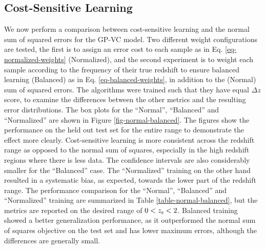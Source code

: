 \documentclass[useAMS,usenatbib,fleqn]{mn2e}
\begin{document}
\subsection{Cost-Sensitive Learning}

We now perform a comparison between cost-sensitive learning and the normal sum of squared errors for the GP-VC model. Two different weight configurations are tested, the first is to assign an error cost to each sample as in Eq. \eqref{eq-normalized-weights} (Normalized), and the second experiment is to weight each sample according to the frequency of their true redshift to ensure balanced learning (Balanced) as in Eq. \eqref{eq-balanced-weights}, in addition to the (Normal) sum of squared errors. The algorithms were trained such that they have equal $\Delta z$ score, to examine the differences between the other metrics and the resulting error distributions. The box plots  for the ``Normal'', ``Balanced'' and ``Normalized'' are shown in Figure \ref{fig-normal-balanced}. The figures show the performance on the held out test set for the entire range to demonstrate the effect more clearly. Cost-sensitive learning is more consistent across the redshift range as opposed to the normal sum of squares, especially in the high redshift regions where there is less data. The confidence intervals are also considerably smaller for the ``Balanced'' case. The ``Normalized'' training on the other hand resulted in a systematic bias, as expected, towards the lower part of the redshift range. The performance comparison for the ``Normal'', ``Balanced'' and ``Normalized'' training are summarized in Table \ref{table-normal-balanced}, but the metrics are reported on the desired range of $0<z_{\rm s}<2$. Balanced training showed a better generalization performance, as it outperformed the normal sum of squares objective on the test set and has lower maximum errors, although the differences are generally small.
\end{document}
